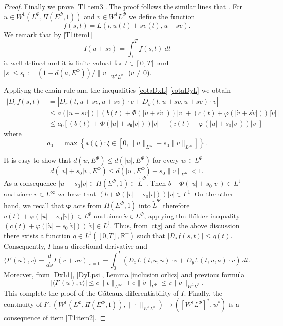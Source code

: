\documentclass[twoside]{article}
\newcommand{\orlnor}{\|_{L^{\Phi}}}
\newcommand{\linf}{\|_{L^{\infty}}}
\newcommand{\lphi}{L^{\Phi}}
\newcommand{\ephi}{E^{\Phi}}
\newcommand{\claseor}{\widetilde{L}^{\Phi}}
\newcommand{\wphi}{W^{1}\lphi}
\newcommand{\sobnor}{\|_{W^{1}\lphi}}
\newcommand{\domi}{W^{1}(\lphi,\Pi(\ephi,1))}
\begin{document}
\begin{proof}
Finally we prove \ref{T1item3}. The proof follows the similar lines that \cite[Theorem 1.4]{mawhin2010critical}. For $u\in \domi$ and $v\in\wphi$ we define the function
\[f(s,t)=L(t,u(t)+sv(t),\dot{u}+s\dot{v}).\]
We remark that by \ref{T1item1}
\[I(u+sv)=\int_0^Tf(s,t)\ dt\]
is well defined and it is finite valued for $t\in [0,T]$ and  $|s|\leq s_0:=\left(1-d(\dot{u},\ephi)\right)/\|v\sobnor$ ($v\neq 0$).

Appliyng the chain rule and the inequalities \eqref{cotaDxL}-\eqref{cotaDyL} we obtain
\begin{equation}\label{ctg}
\begin{split}
|D_s f(s,t)|&=|D_x(t,u+sv,\dot{u}+s\dot{v})\cdot v + D_y(t,u+sv,\dot{u}+s\dot{v})\cdot \dot{v}| \\
&\leq a(|u+sv|)\left[(b(t)+\Phi(|\dot{u}+s\dot{v}|))|v|+ (c(t)+ \varphi(|\dot{u}+s\dot{v}|))|\dot{v}|\right]\\
& \leq a_0 \left[(b(t)+\Phi(|\dot{u}|+s_0|\dot{v}|))|v|+ (c(t)+ \varphi(|\dot{u}|+s_0|\dot{v}|))|\dot{v}|  \right]
\end{split}
\end{equation}
where
\[
 a_0 = \max \left\{ a(\xi): \xi\in \left[0, \|u \linf + s_0 \|v \linf \right] \right\}.
\]

It is easy to show that $d(w,\ephi)\leq d(|w|,\ephi)$ for every $w \in \lphi$
\[
d \left(|\dot{u}|+s_0|\dot{v}|, \ephi \right) %
\leq d \left(|\dot{u}|,\ephi \right)+ s_0 \|\dot{v}\orlnor < 1.
\]
As a consequence $|\dot{u}|+s_0|\dot{v}| \in \Pi(\ephi,1) \subset \claseor$. Then $b+\Phi(|\dot{u}|+s_0|\dot{v}|) \in L^1$ and since $v \in L^{\infty}$ we have that
$(b+\Phi(|\dot{u}|+s_0|\dot{v}|))|v| \in L^1$. On the other hand, we recall that $\boldsymbol{\varphi}$ acts from  $\Pi(\ephi,1)$ into $\tilde{L}^{\Psi}$ therefore
$c(t)+ \varphi(|\dot{u}|+s_0|\dot{v}|) \in L^{\Psi}$ and since $\dot{v} \in L^{\Phi}$, applying the H\"older inequality
$(c(t)+ \varphi(|\dot{u}|+s_0|\dot{v}|))|\dot{v}| \in L^1$. Thus, from \eqref{ctg} and the above discussion there exists a function $g \in L^1([0,T], \mathbb{R}^{+})$
such that $|D_s f(s,t)| \leq g(t)$. Consequently, $I$ has a directional derivative and
\[
\langle I'(u), v \rangle=\frac{d}{ds}I(u+sv)\big|_{s=0}=\int_0^T \left(D_{x}L(t,u,\dot{u})\cdot v+ D_{y}L(t,u,\dot{u})\cdot\dot{v}\right) \ dt.
\]
Moreover, from \eqref{DxL1}, \eqref{DyLpsi}, Lemma \ref{inclusion orlicz} and previous formula
\[
|\langle I'(u), v \rangle| \leq c \|v\linf + c \|\dot{v}\orlnor \leq c \|v\sobnor.
\]
This complete the proof of the G\^ateaux differentiability of $I$. Finally, the continuity of $I': \left(\domi, \|\cdot \sobnor\right) \to \left(\left[\wphi
\right]^*, w^* \right)$ is a consequence of item \ref{T1item2}.
\end{proof}
\end{document}
